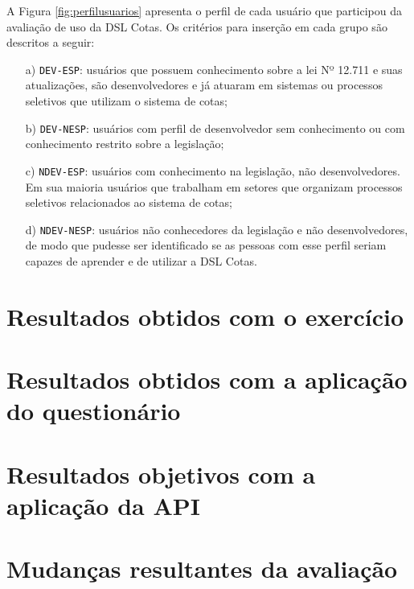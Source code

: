 A Figura \ref{fig:perfilusuarios} apresenta o perfil de cada usuário que participou da avaliação de uso da DSL Cotas. Os critérios para inserção em cada grupo são descritos a seguir:

\begin{enumerate}
    \item[a)] \texttt{DEV-ESP}: usuários que possuem conhecimento sobre a lei Nº 12.711 e suas atualizações, são desenvolvedores e já atuaram em sistemas ou processos seletivos que utilizam o sistema de cotas;
    \item[b)] \texttt{DEV-NESP}: usuários com perfil de desenvolvedor sem conhecimento ou com conhecimento restrito sobre a legislação;
    \item[c)] \texttt{NDEV-ESP}: usuários com conhecimento na legislação, não desenvolvedores. Em sua maioria usuários que trabalham em setores que organizam processos seletivos relacionados ao sistema de cotas;
    \item[d)] \texttt{NDEV-NESP}: usuários não conhecedores da legislação e não desenvolvedores, de modo que pudesse ser identificado se as pessoas com esse perfil seriam capazes de aprender e de utilizar a DSL Cotas.
\end{enumerate}


\begin{landscape}

\end{landscape}

\section{Resultados obtidos com o exercício}
\label{sec:analiseexercicio}




\section{Resultados obtidos com a aplicação do questionário}
\label{sec:questionarioexercicio}




\section{Resultados objetivos com a aplicação da API}
\label{sec:avaliacaoapi}


\section{Mudanças resultantes da avaliação}
\label{sec:mudanasresultantes}